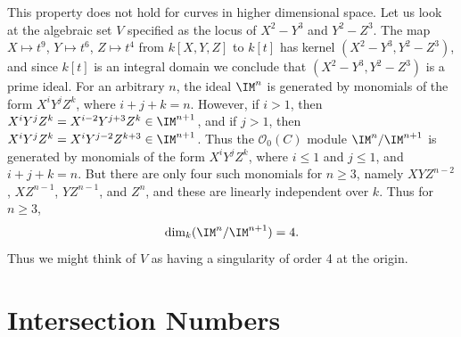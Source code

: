 \begin{example}
    This property does not hold for curves in higher dimensional space. Let us look at the algebraic set $V$ specified as the locus of $X^2 - Y^3$ and $Y^2 - Z^3$. The map $X \mapsto t^9$, $Y \mapsto t^6$, $Z \mapsto t^4$ from $k[X,Y,Z]$ to $k[t]$ has kernel $(X^2 - Y^3, Y^2 - Z^3)$, and since $k[t]$ is an integral domain we conclude that $(X^2 - Y^3, Y^2 - Z^3)$ is a prime ideal. For an arbitrary $n$, the ideal $\IM^n$ is generated by monomials of the form $X^iY^jZ^k$, where $i + j + k = n$. However, if $i > 1$, then $X^iY^jZ^k = X^{i-2}Y^{j+3}Z^k \in \IM^{n+1}$, and if $j > 1$, then $X^iY^jZ^k = X^iY^{j-2}Z^{k+3} \in \IM^{n+1}$. Thus the $\mathcal{O}_0(C)$ module $\IM^n/\IM^{n+1}$ is generated by monomials of the form $X^iY^jZ^k$, where $i \leq 1$ and $j \leq 1$, and $i + j + k = n$. But there are only four such monomials for $n \geq 3$, namely $XYZ^{n-2}$, $XZ^{n-1}$, $YZ^{n-1}$, and $Z^n$, and these are linearly independent over $k$. Thus for $n \geq 3$,
    \[ \dim_k(\IM^n/\IM^{n+1}) = 4. \]
    Thus we might think of $V$ as having a singularity of order 4 at the origin.
\end{example}

\section{Intersection Numbers}


